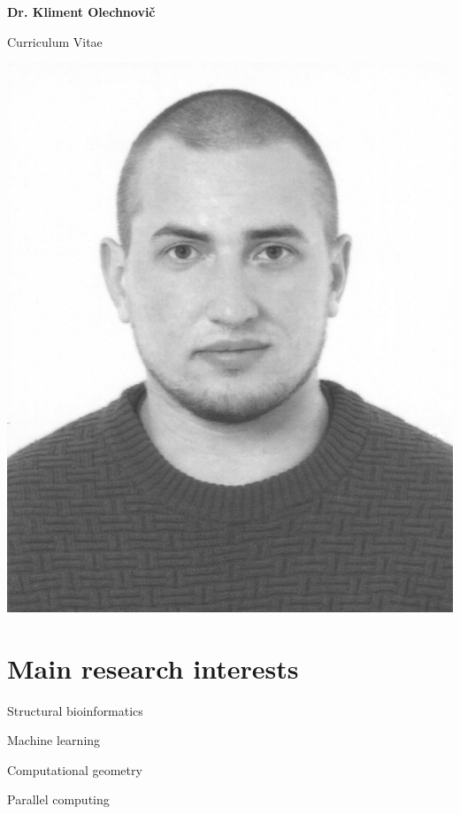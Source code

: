 \documentclass{article}
\def\name{Dr. Kliment Olechnovič}
\newenvironment{itemize_tight}{
\begin{itemize}
  \setlength{\itemsep}{4pt}
  \setlength{\parskip}{0pt}
  \setlength{\parsep}{0pt}
}{\end{itemize}}
\begin{document}
\begin{minipage}{0.75\linewidth}
\begin{center}
{\huge \bf \name}
\end{center}

\begin{center}
{\Large Curriculum Vitae}
\end{center}
\end{minipage}
\begin{minipage}{0.25\linewidth}
\includegraphics[width=\linewidth]{photo.jpg}
\end{minipage}


\section*{Main research interests}

\begin{minipage}{0.3\linewidth}
\begin{itemize_tight}
  \item Structural bioinformatics
  \item Machine learning
\end{itemize_tight}
\end{minipage}
\begin{minipage}{0.7\linewidth}
\begin{itemize_tight}
  \item Computational geometry
  \item Parallel computing
\end{itemize_tight}
\end{minipage}
\end{document}
